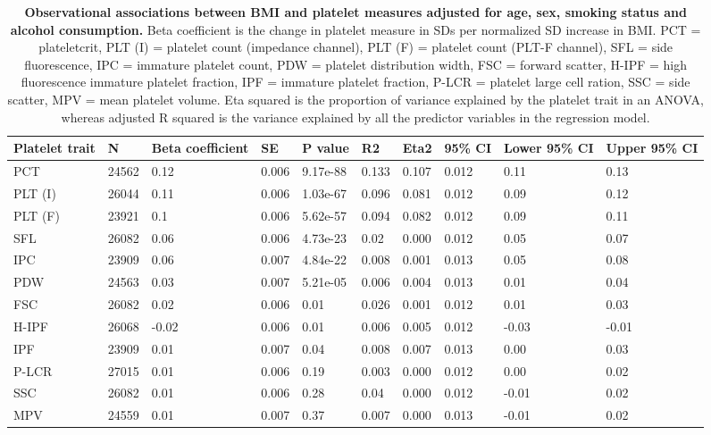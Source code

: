 \documentclass[11pt,twoside]{bristolthesis}
\begin{document}
\begin{landscape}\begin{table}

\caption[Observational associations between BMI and platelet measures adjusted for age, sex, smoking status and alcohol consumption]{\label{tab:BMI-platelets-adjust}\textbf{Observational associations between BMI and platelet measures adjusted for age, sex, smoking status and alcohol consumption.} Βeta coefficient is the change in platelet measure in SDs per normalized SD increase in BMI. PCT = plateletcrit, PLT (I) = platelet count (impedance channel), PLT (F) = platelet count (PLT-F channel), SFL = side fluorescence, IPC = immature platelet count, PDW = platelet distribution width, FSC = forward scatter, H-IPF = high fluorescence immature platelet fraction, IPF = immature platelet fraction, P-LCR = platelet large cell ration, SSC = side scatter, MPV = mean platelet volume. Eta squared is the proportion of variance explained by the platelet trait in an ANOVA, whereas adjusted R squared is the variance explained by all the predictor variables in the regression model.}
\centering
\begin{tabu} to 
\toprule
Platelet trait & N & Βeta coefficient & SE & P value & R2 & Eta2 & 95\% CI & Lower 95\% CI & Upper 95\% CI\\
\midrule
PCT & 24562 & 0.12 & 0.006 & 9.17e-88 & 0.133 & 0.107 & 0.012 & 0.11 & 0.13\\
PLT (I) & 26044 & 0.11 & 0.006 & 1.03e-67 & 0.096 & 0.081 & 0.012 & 0.09 & 0.12\\
PLT (F) & 23921 & 0.1 & 0.006 & 5.62e-57 & 0.094 & 0.082 & 0.012 & 0.09 & 0.11\\
SFL & 26082 & 0.06 & 0.006 & 4.73e-23 & 0.02 & 0.000 & 0.012 & 0.05 & 0.07\\
IPC & 23909 & 0.06 & 0.007 & 4.84e-22 & 0.008 & 0.001 & 0.013 & 0.05 & 0.08\\
\addlinespace
PDW & 24563 & 0.03 & 0.007 & 5.21e-05 & 0.006 & 0.004 & 0.013 & 0.01 & 0.04\\
FSC & 26082 & 0.02 & 0.006 & 0.01 & 0.026 & 0.001 & 0.012 & 0.01 & 0.03\\
H-IPF & 26068 & -0.02 & 0.006 & 0.01 & 0.006 & 0.005 & 0.012 & -0.03 & -0.01\\
IPF & 23909 & 0.01 & 0.007 & 0.04 & 0.008 & 0.007 & 0.013 & 0.00 & 0.03\\
P-LCR & 27015 & 0.01 & 0.006 & 0.19 & 0.003 & 0.000 & 0.012 & 0.00 & 0.02\\
\addlinespace
SSC & 26082 & 0.01 & 0.006 & 0.28 & 0.04 & 0.000 & 0.012 & -0.01 & 0.02\\
MPV & 24559 & 0.01 & 0.007 & 0.37 & 0.007 & 0.000 & 0.013 & -0.01 & 0.02\\
\bottomrule
\end{tabu}
\end{table}
\end{landscape}
\end{document}
